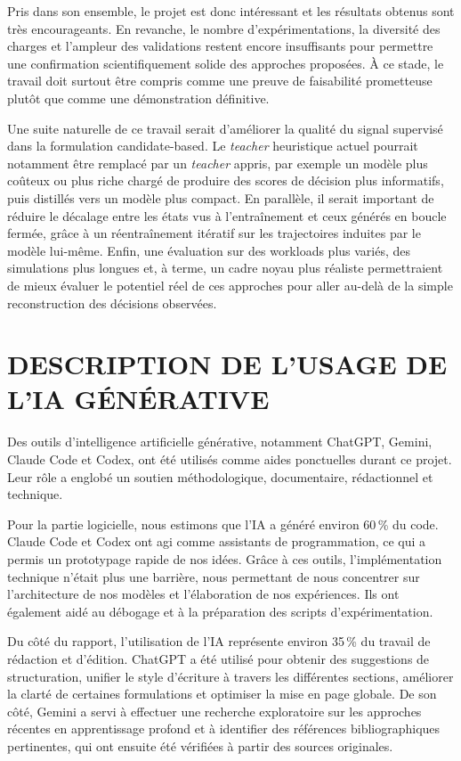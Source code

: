 \documentclass[letterpaper, 10 pt, conference]{ieeeconf}  %
\begin{document}
Pris dans son ensemble, le projet est donc intéressant et les résultats obtenus sont très encourageants. En revanche, le nombre d'expérimentations, la diversité des charges et l'ampleur des validations restent encore insuffisants pour permettre une confirmation scientifiquement solide des approches proposées. À ce stade, le travail doit surtout être compris comme une preuve de faisabilité prometteuse plutôt que comme une démonstration définitive.

Une suite naturelle de ce travail serait d'améliorer la qualité du signal supervisé dans la formulation candidate-based. Le \textit{teacher} heuristique actuel pourrait notamment être remplacé par un \textit{teacher} appris, par exemple un modèle plus coûteux ou plus riche chargé de produire des scores de décision plus informatifs, puis distillés vers un modèle plus compact. En parallèle, il serait important de réduire le décalage entre les états vus à l'entraînement et ceux générés en boucle fermée, grâce à un réentraînement itératif sur les trajectoires induites par le modèle lui-même. Enfin, une évaluation sur des workloads plus variés, des simulations plus longues et, à terme, un cadre noyau plus réaliste permettraient de mieux évaluer le potentiel réel de ces approches pour aller au-delà de la simple reconstruction des décisions observées.


\section{DESCRIPTION DE L'USAGE DE L'IA GÉNÉRATIVE}

Des outils d'intelligence artificielle générative, notamment ChatGPT, Gemini, Claude Code et Codex, ont été utilisés comme aides ponctuelles durant ce projet. Leur rôle a englobé un soutien méthodologique, documentaire, rédactionnel et technique.

Pour la partie logicielle, nous estimons que l'IA a généré environ 60\,\% du code. Claude Code et Codex ont agi comme assistants de programmation, ce qui a permis un prototypage rapide de nos idées. Grâce à ces outils, l'implémentation technique n'était plus une barrière, nous permettant de nous concentrer sur l'architecture de nos modèles et l'élaboration de nos expériences. Ils ont également aidé au débogage et à la préparation des scripts d'expérimentation.

Du côté du rapport, l'utilisation de l'IA représente environ 35\,\% du travail de rédaction et d'édition. ChatGPT a été utilisé pour obtenir des suggestions de structuration, unifier le style d'écriture à travers les différentes sections, améliorer la clarté de certaines formulations et optimiser la mise en page globale. De son côté, Gemini a servi à effectuer une recherche exploratoire sur les approches récentes en apprentissage profond et à identifier des références bibliographiques pertinentes, qui ont ensuite été vérifiées à partir des sources originales.
\end{document}
